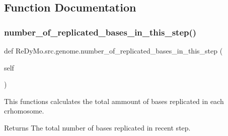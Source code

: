 \subsection{Function Documentation}
\mbox{\label{namespaceReDyMo_1_1src_1_1genome_add11ea37fbc0e256164c4107d758b43b}} 
\subsubsection{\texorpdfstring{number\+\_\+of\+\_\+replicated\+\_\+bases\+\_\+in\+\_\+this\+\_\+step()}{number\_of\_replicated\_bases\_in\_this\_step()}}
{\footnotesize\ttfamily def Re\+Dy\+Mo.\+src.\+genome.\+number\+\_\+of\+\_\+replicated\+\_\+bases\+\_\+in\+\_\+this\+\_\+step (\begin{DoxyParamCaption}\item[{}]{self }\end{DoxyParamCaption})}



This functions calculates the total ammount of bases replicated in each crhomosome. 

\begin{DoxyReturn}{Returns}
The total number of bases replicated in recent step. 
\end{DoxyReturn}
